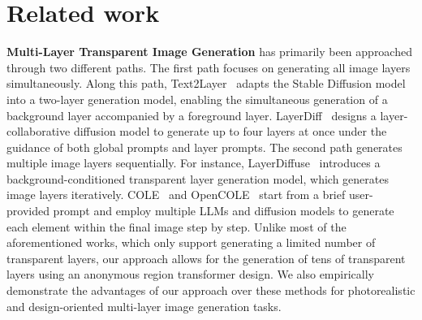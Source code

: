 \section{Related work}
\label{sec:related_work}
\noindent\textbf{Multi-Layer Transparent Image Generation} has primarily been approached through two different paths. The first path focuses on generating all image layers simultaneously. Along this path, Text2Layer~\cite{zhang2023text2layer} adapts the Stable Diffusion model into a two-layer generation model, enabling the simultaneous generation of a background layer accompanied by a foreground layer. LayerDiff~\cite{huang2024layerdiff} designs a layer-collaborative diffusion model to generate up to four layers at once under the guidance of both global prompts and layer prompts.
The second path generates multiple image layers sequentially. For instance, LayerDiffuse~\cite{zhang2024transparent} introduces a background-conditioned transparent layer generation model, which generates image layers iteratively. COLE~\cite{jia2023cole} and OpenCOLE~\cite{inoue2024opencole} start from a brief user-provided prompt and employ multiple LLMs and diffusion models to generate each element within the final image step by step.
Unlike most of the aforementioned works, which only support generating a limited number of transparent layers, our approach allows for the generation of tens of transparent layers using an anonymous region transformer design. We also empirically demonstrate the advantages of our approach over these methods for photorealistic and design-oriented multi-layer image generation tasks.


